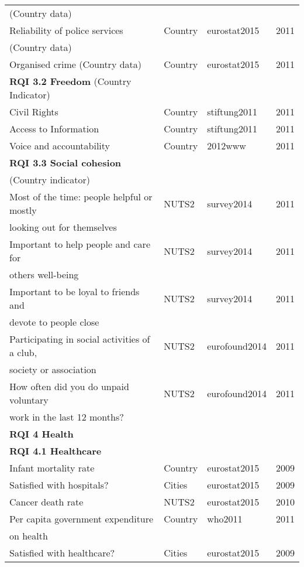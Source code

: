 \documentclass[a4paper,twoside]{article}
\begin{document}
{\begin{longtable}{llll}
    (Country data) &  &  &  \\
    Reliability of police services & Country & eurostat2015 & 2011 \\
    (Country data) &   &   &   \\
    Organised crime (Country data) & Country & eurostat2015 & 2011 \\[3mm]
    {\bf RQI 3.2  Freedom} (Country Indicator) &       &       &  \\
    Civil Rights & Country & stiftung2011 & 2011 \\
    Access to Information & Country & stiftung2011 & 2011 \\
    Voice and accountability & Country & 2012www & 2011 \\[3mm]
    {\bf RQI 3.3 Social cohesion} &  &       &  \\
    (Country indicator) &  &       &  \\
    Most of the time: people helpful or mostly& NUTS2 & survey2014 & 2011 \\
    looking out for themselves &  &  &  \\
    Important to help people and care for & NUTS2 & survey2014 & 2011 \\
    others well-being &  &  &  \\
    Important to be loyal to friends and & NUTS2 & survey2014 & 2011 \\
    devote to people close &  &   &  \\
    Participating in social activities of a club, & NUTS2 & eurofound2014 & 2011 \\
    society or association &  &  &  \\
    How often did you do unpaid voluntary & NUTS2 & eurofound2014 & 2011 \\
    work in the last 12 months? &  &  &  \\[3mm]
    {\bf RQI 4 Health} &       &       &  \\
    {\bf RQI 4.1 Healthcare}  &       &       &  \\
    Infant mortality rate & Country & eurostat2015 & 2009 \\
    Satisfied with hospitals? & Cities & eurostat2015 & 2009 \\
    Cancer death rate & NUTS2 & eurostat2015 & 2010 \\
    Per capita government expenditure & Country & who2011 & 2011 \\
    on health &   &   &   \\
    Satisfied with healthcare? & Cities & eurostat2015 & 2009 \\

\end{longtable}}
\end{document}
